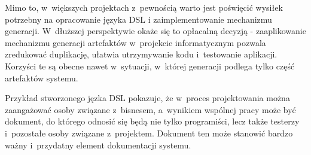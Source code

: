 Mimo to, w~większych projektach z~pewnością warto jest poświęcić wysiłek potrzebny na opracowanie języka DSL i zaimplementowanie mechanizmu generacji.
W~dłuższej perspektywie okaże się to opłacalną decyzją - zaaplikowanie mechanizmu generacji artefaktów w~projekcie informatycznym pozwala zredukować duplikację, ułatwia utrzymywanie kodu i~testowanie aplikacji.
Korzyści te są obecne nawet w~sytuacji, w~której  generacji podlega tylko część artefaktów systemu.

Przykład stworzonego jęzka DSL pokazuje, że w~proces projektowania można zaangażować osoby związane z~bisnesem, a~wynikiem wspólnej pracy może być dokument, do którego odnosić się będą nie tylko programiści, lecz także testerzy i~pozostałe osoby związane z~projektem.
Dokument ten może stanowić bardzo ważny i~przydatny element dokumentacji systemu.